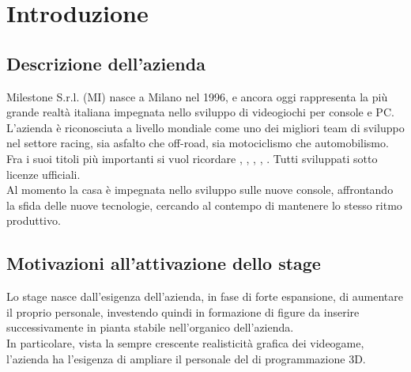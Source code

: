 
\chapter{Introduzione}
\label{cap:introduzione}

\section{Descrizione dell'azienda}

Milestone S.r.l. (MI) nasce a Milano nel 1996, e ancora oggi rappresenta la più grande realtà italiana impegnata nello sviluppo di videogiochi per console e PC. L'azienda è riconosciuta a livello mondiale come uno dei migliori team di sviluppo nel settore racing, sia asfalto che off-road, sia motociclismo che automobilismo\cite{site:milestone}.\\

Fra i suoi titoli più importanti si vuol ricordare , , , , . Tutti sviluppati sotto licenze ufficiali.\\

Al momento la casa è impegnata nello sviluppo sulle nuove console, affrontando la sfida delle nuove tecnologie, cercando al contempo di mantenere lo stesso ritmo produttivo. 

\section{Motivazioni all'attivazione dello stage}

Lo stage nasce dall'esigenza dell'azienda, in fase di forte espansione, di aumentare il proprio personale, investendo quindi in formazione di figure  da inserire successivamente in pianta stabile nell'organico dell'azienda.\\

In particolare, vista la sempre crescente realisticità grafica dei videogame, l'azienda ha l'esigenza di ampliare il personale del  di programmazione 3D.

